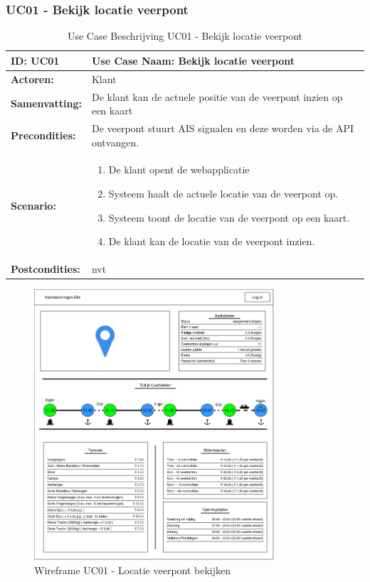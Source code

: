 \documentclass{article}
\begin{document}
\subsubsection{UC01 - Bekijk locatie veerpont}
\begin{table}[h]
    \centering
    \begin{tabularx}{\textwidth}{|l|X|}
        \hline
        \textbf{ID:} UC01 & \textbf{Use Case Naam:} Bekijk locatie veerpont  \\
        \hline
        \textbf{Actoren:} & Klant \\
        \hline
        \textbf{Samenvatting:}  & De klant kan de actuele positie van de veerpont inzien op een kaart \\
        \hline 
        \textbf{Precondities:} & De veerpont stuurt AIS signalen en deze worden via de API ontvangen. \\
        \hline
        \textbf{Scenario:} & \begin{enumerate}
            \item De klant opent de webapplicatie
            \item Systeem haalt de actuele locatie van de veerpont op.
            \item Systeem toont de locatie van de veerpont op een kaart.
            \item De klant kan de locatie van de veerpont inzien.
        \end{enumerate} \\
        \hline 
        \textbf{Postcondities:} & nvt \\ 
        \hline

    \end{tabularx}
    \caption{Use Case Beschrijving UC01 - Bekijk locatie veerpont}
\end{table}

\begin{figure}[h]
    \centering
    \label{fig:wf1}
    \includegraphics[width=0.8\textwidth]{images/wireframe_startpagina.png}
    \caption{Wireframe UC01 - Locatie veerpont bekijken}
\end{figure}
\end{document}
